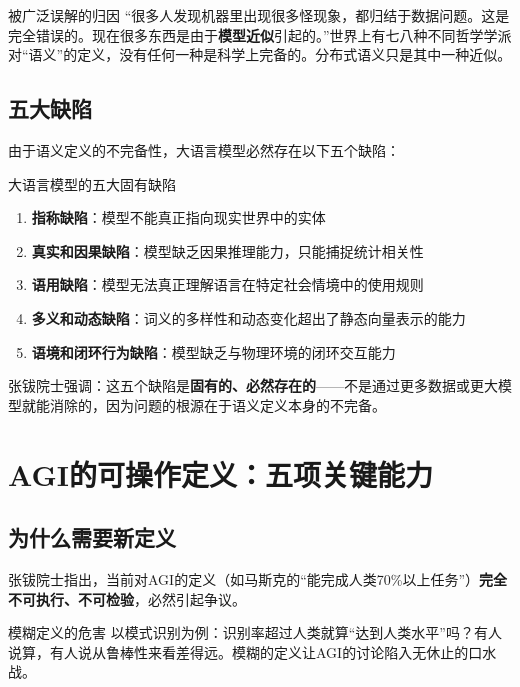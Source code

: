 \documentclass[a4paper]{article}
\begin{document}
\begin{warningbox}{被广泛误解的归因}
``很多人发现机器里出现很多怪现象，都归结于数据问题。这是完全错误的。现在很多东西是由于\textbf{模型近似}引起的。''世界上有七八种不同哲学学派对``语义''的定义，没有任何一种是科学上完备的。分布式语义只是其中一种近似。
\end{warningbox}

\subsection{五大缺陷}

由于语义定义的不完备性，大语言模型必然存在以下五个缺陷：

\begin{importantbox}{大语言模型的五大固有缺陷}
\begin{enumerate}
\item \textbf{指称缺陷}：模型不能真正指向现实世界中的实体
\item \textbf{真实和因果缺陷}：模型缺乏因果推理能力，只能捕捉统计相关性
\item \textbf{语用缺陷}：模型无法真正理解语言在特定社会情境中的使用规则
\item \textbf{多义和动态缺陷}：词义的多样性和动态变化超出了静态向量表示的能力
\item \textbf{语境和闭环行为缺陷}：模型缺乏与物理环境的闭环交互能力
\end{enumerate}
\end{importantbox}

张钹院士强调：这五个缺陷是\textbf{固有的、必然存在的}——不是通过更多数据或更大模型就能消除的，因为问题的根源在于语义定义本身的不完备。


\section{AGI的可操作定义：五项关键能力}

\subsection{为什么需要新定义}

张钹院士指出，当前对AGI的定义（如马斯克的``能完成人类70\%以上任务''）\textbf{完全不可执行、不可检验}，必然引起争议。

\begin{warningbox}{模糊定义的危害}
以模式识别为例：识别率超过人类就算``达到人类水平''吗？有人说算，有人说从鲁棒性来看差得远。模糊的定义让AGI的讨论陷入无休止的口水战。
\end{warningbox}
\end{document}
